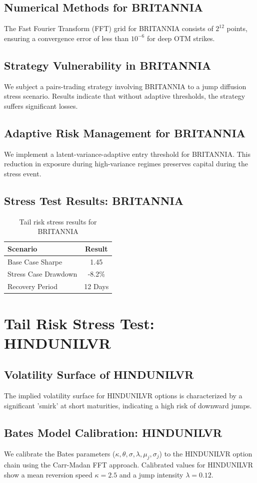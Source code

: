 \documentclass[12pt,a4paper,twoside]{article}
\begin{document}
\subsection{Numerical Methods for BRITANNIA}
The Fast Fourier Transform (FFT) grid for BRITANNIA consists of $2^{12}$ points, ensuring a convergence error of less than $10^{-6}$ for deep OTM strikes.
\subsection{Strategy Vulnerability in BRITANNIA}
We subject a pairs-trading strategy involving BRITANNIA to a jump diffusion stress scenario. Results indicate that without adaptive thresholds, the strategy suffers significant losses.
\subsection{Adaptive Risk Management for BRITANNIA}
We implement a latent-variance-adaptive entry threshold for BRITANNIA. This reduction in exposure during high-variance regimes preserves capital during the stress event.
\subsection{Stress Test Results: BRITANNIA}
\begin{table}[H]
\centering
\begin{tabular}{|l|c|}
\hline
Scenario & Result \\
\hline
Base Case Sharpe & 1.45 \\
Stress Case Drawdown & -8.2\% \\
Recovery Period & 12 Days \\
\hline
\end{tabular}
\caption{Tail risk stress results for BRITANNIA}
\end{table}
\newpage

\section{Tail Risk Stress Test: HINDUNILVR}
\subsection{Volatility Surface of HINDUNILVR}
The implied volatility surface for HINDUNILVR options is characterized by a significant 'smirk' at short maturities, indicating a high risk of downward jumps.
\subsection{Bates Model Calibration: HINDUNILVR}
We calibrate the Bates parameters ($\kappa, \theta, \sigma, \lambda, \mu_j, \sigma_j$) to the HINDUNILVR option chain using the Carr-Madan FFT approach.
Calibrated values for HINDUNILVR show a mean reversion speed $\kappa = 2.5$ and a jump intensity $\lambda = 0.12$.
\end{document}
